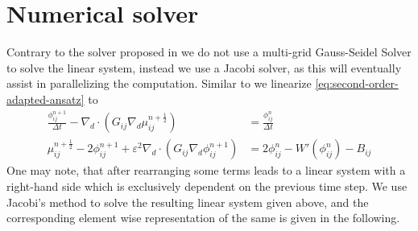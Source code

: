 \documentclass{mimosis}
\begin{document}
\chapter{Numerical solver}
\label{sec:orgf5198c1}
Contrary to the solver proposed in \autocite{Ulmer_CHRelaxed_2024} we do not use a multi-grid Gauss-Seidel Solver to solve the linear system, instead we use a Jacobi solver, as this will eventually assist in parallelizing the computation.
Similar to \autocite{Ulmer_CHRelaxed_2024} we linearize \eqref{eq:second-order-adapted-ansatz} to
\begin{equation}
\begin{aligned}
\frac{\phi_{ij}^{n+1}}{\Delta t}  -  \nabla _d \cdot (G_{ij} \nabla_d \mu_{ij}^{n+\frac{1}{2}} ) &= \frac{ \phi_{ij}^n}{\Delta t}  \\
 \mu_{ij}^{n+\frac{1}{2}} - 2\phi_{ij}^{n+1} + \varepsilon^2  \nabla_d \cdot  (G_{ij} \nabla _d \phi_{ij}^{n+1} ) &=2\phi _{ij}^n - W'(\phi_{ij}^n)  - B_{ij}
\end{aligned}
\end{equation}
One may note, that after rearranging some terms leads to a linear system with a right-hand side which is exclusively dependent on the previous time step.
We use Jacobi's method to solve the resulting linear system given above, and the corresponding element wise representation of the same is given in the following.
\end{document}
